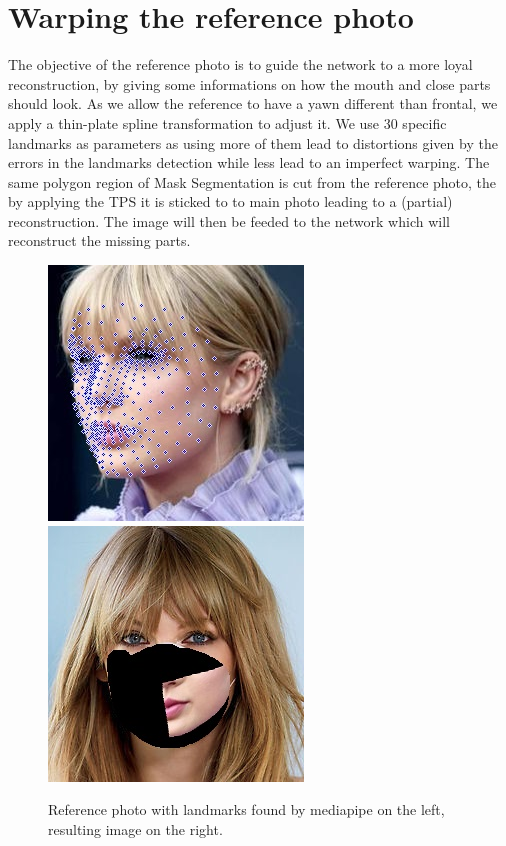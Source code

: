 \documentclass[10pt,twocolumn,letterpaper]{article}
\begin{document}
\section{Warping the reference photo}
The objective of the reference photo is to guide the network to a more loyal
reconstruction, by giving some informations on how the mouth and close parts
should look. As we allow the reference to have a yawn different than frontal, we
apply a thin-plate spline transformation to adjust it. We use 30 specific
landmarks as parameters as using more of them lead to distortions given by the
errors in the landmarks detection while less lead to an imperfect warping. The
same polygon region of Mask Segmentation is cut from the reference photo, the by
applying the TPS it is sticked to to main photo leading to a (partial)
reconstruction. The image will then be feeded to the network which will
reconstruct the missing parts.
\begin{figure}
  \caption{Reference photo with landmarks found by mediapipe on the left,
  resulting image on the right.}
  \includegraphics[width=0.49\linewidth]{img/landmarks_lateral.jpeg}
  \includegraphics[width=0.49\linewidth]{img/result.jpg}
\end{figure}
\end{document}
